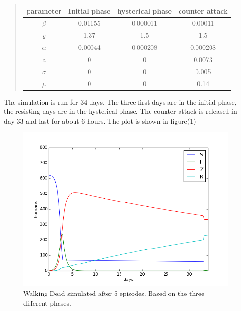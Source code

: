 \documentclass[%
twoside,                 %
final,                   %
10pt]{article}
\begin{document}
\begin{quote}
\begin{tabular}{cccc}
\hline
\multicolumn{1}{c}{ parameter } & \multicolumn{1}{c}{ Initial phase } & \multicolumn{1}{c}{ hysterical phase } & \multicolumn{1}{c}{ counter attack } \\
\hline
$\beta$          & 0.01155          & 0.000011         & 0.00011          \\
$\varrho$        & 1.37             & 1.5              & 1.5              \\
$\alpha$         & 0.00044          & 0.000208         & 0.000208         \\
a                & 0                & 0                & 0.0073           \\
$\sigma$         & 0                & 0                & 0.005            \\
$\mu$            & 0                & 0                & 0.14             \\
\hline
\end{tabular}
\end{quote}

\noindent

The simulation is run for 34 days. The three first days are in the initial phase, the resisting days are in the hysterical phase. The counter attack is released in day 33 and last for about 6 hours. The plot is shown in figure(\ref{fig:all_phases})   


\begin{figure}[ht]
  \centerline{\includegraphics[width=0.9\linewidth]{plots/WD_zombie_all_phases_1.png}}
  \caption{
  \label{fig:all_phases} Walking Dead simulated after 5 episodes. Based on the three different phases.
  }
\end{figure}
\end{document}
